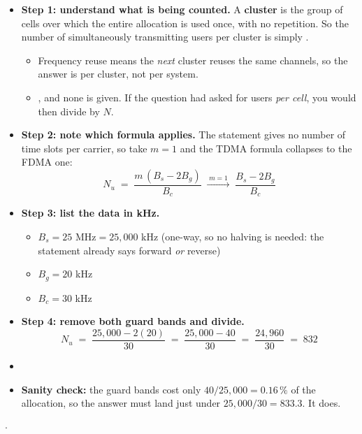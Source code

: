 \begin{itemize}
  \item \textbf{Step 1: understand what is being counted.} A \textbf{cluster} is the group of
        cells over which the entire allocation is used once, with no repetition. So the number
        of simultaneously transmitting users per cluster is simply
        .
  \begin{itemize}
    \item Frequency reuse means the \emph{next} cluster reuses the same channels, so the answer
          is per cluster, not per system.
    \item {}, and none is given. If the question had asked for
          users \emph{per cell}, you would then divide by $N$.
  \end{itemize}
  \item \textbf{Step 2: note which formula applies.} The statement gives no number of time slots
        per carrier, so take $m = 1$ and the TDMA formula collapses to the FDMA one:
        \[ N_u \;=\; \frac{m\,(B_s - 2B_g)}{B_c} \;\xrightarrow{\;m=1\;}\;
           \frac{B_s - 2B_g}{B_c} \]
  \item \textbf{Step 3: list the data in kHz.}
  \begin{itemize}
    \item $B_s = 25 \text{ MHz} = 25{,}000$ kHz (one-way, so no halving is needed: the
          statement already says forward \emph{or} reverse)
    \item $B_g = 20$ kHz \; \item $B_c = 30$ kHz
  \end{itemize}
  \item \textbf{Step 4: remove both guard bands and divide.}
        \[ N_u \;=\; \frac{25{,}000 - 2(20)}{30} \;=\; \frac{25{,}000 - 40}{30}
           \;=\; \frac{24{,}960}{30} \;=\; 832 \]
  \item {}
  \item \textbf{Sanity check:} the guard bands cost only $40/25{,}000 = 0.16\,\%$ of the
        allocation, so the answer must land just under $25{,}000/30 = 833.3$. It does.
\end{itemize}

\hr

{\color{sub}\footnotesize {}  \gap$\cdot$\gap
{}}

